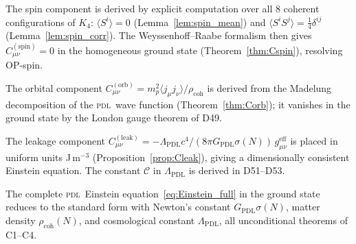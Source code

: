 \documentclass[12pt,a4paper]{article}
\newcommand{\Kfour}{K_4}
\newcommand{\PDL}{\textsc{pdl}}
\newcommand{\Cspin}{C^{(\mathrm{spin})}}
\newcommand{\Corb}{C^{(\mathrm{orb})}}
\newcommand{\Cleak}{C^{(\mathrm{leak})}}
\newcommand{\rhocoh}{\rho_{\mathrm{coh}}}
\newcommand{\sig}{\sigma}
\newcommand{\GPDL}{G_{\mathrm{PDL}}}
\newcommand{\geff}{g_{\mu\nu}^{\mathrm{eff}}}
\newcommand{\LambdaPDL}{\Lambda_{\mathrm{PDL}}}
\begin{document}
The spin component is derived by explicit computation over all 8 coherent configurations of $\Kfour$: $\langle S^i\rangle = 0$ (Lemma~\ref{lem:spin_mean}) and $\langle S^i S^j\rangle = \tfrac{1}{4}\delta^{ij}$ (Lemma~\ref{lem:spin_corr}). The Weyssenhoff--Raabe formalism then gives $\Cspin_{\mu\nu} = 0$ in the homogeneous ground state (Theorem~\ref{thm:Cspin}), resolving OP-spin.

The orbital component $\Corb_{\mu\nu} = m_p^2\langle j_\mu j_\nu\rangle/\rhocoh$ is derived from the Madelung decomposition of the \PDL\ wave function (Theorem~\ref{thm:Corb}); it vanishes in the ground state by the London gauge theorem of D49.

The leakage component $\Cleak_{\mu\nu} = -\LambdaPDL c^4/(8\pi\GPDL\sig(N))\,\geff$ is placed in uniform units J\,m$^{-3}$ (Proposition~\ref{prop:Cleak}), giving a dimensionally consistent Einstein equation. The constant $\mathcal{C}$ in $\LambdaPDL$ is derived in D51--D53.

The complete \PDL\ Einstein equation~\eqref{eq:Einstein_full} in the ground state reduces to the standard form with Newton's constant $\GPDL\sig(N)$, matter density $\rhocoh(N)$, and cosmological constant $\LambdaPDL$, all unconditional theorems of C1--C4.

\clearpage



\end{document}
